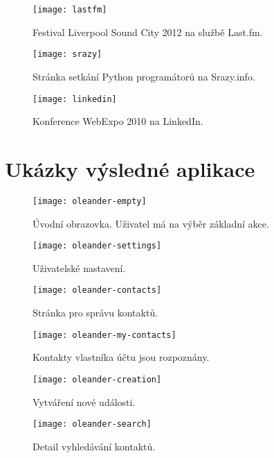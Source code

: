 \documentclass[12pt,oneside,final]{fithesis2}
\begin{document}
\begin{figure}[h]
    \texttt{[image: lastfm]}
    \caption{Festival Liverpool Sound City 2012 na službě Last.fm.}
\end{figure}

\begin{figure}[h]
    \texttt{[image: srazy]}
    \caption{Stránka setkání Python programátorů na Srazy.info.}
\end{figure}

\begin{figure}[h]
    \texttt{[image: linkedin]}
    \caption{Konference WebExpo 2010 na LinkedIn.}
\end{figure}



\chapter{Ukázky výsledné aplikace}\label{oleanderPictures}

\begin{figure}[h]
    \centering
    \texttt{[image: oleander-empty]}
    \caption{Úvodní obrazovka. Uživatel má na výběr základní akce.}
\end{figure}

\begin{figure}[h]
    \centering
    \texttt{[image: oleander-settings]}
    \caption{Uživatelské nastavení.}
\end{figure}

\begin{figure}[h]
    \centering
    \texttt{[image: oleander-contacts]}
    \caption{Stránka pro správu kontaktů.}
\end{figure}

\begin{figure}[h]
    \centering
    \texttt{[image: oleander-my-contacts]}
    \caption{Kontakty vlastníka účtu jsou rozpoznány.}
\end{figure}

\begin{figure}[h]
    \centering
    \texttt{[image: oleander-creation]}
    \caption{Vytváření nové události.}
\end{figure}

\begin{figure}[h]
    \centering
    \texttt{[image: oleander-search]}
    \caption{Detail vyhledávání kontaktů.}
\end{figure}
\end{document}
